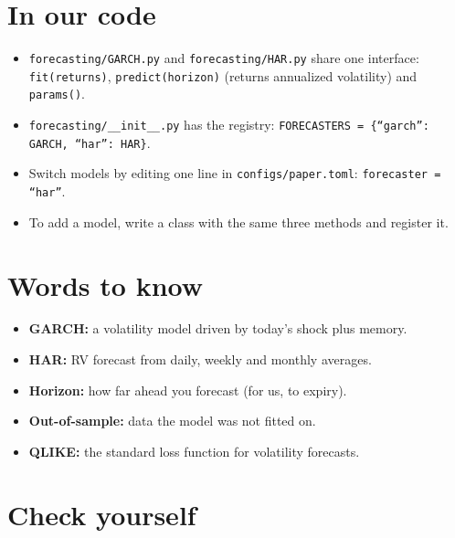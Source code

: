 \documentclass{article}
\begin{document}
\section{In our code}

\begin{itemize}

\item \texttt{forecasting/\allowbreak{}GARCH.\allowbreak{}py} and \texttt{forecasting/\allowbreak{}HAR.\allowbreak{}py} share one interface: \texttt{fit(returns)}, \texttt{predict(horizon)} (returns annualized volatility) and \texttt{params()}.

\item \texttt{forecasting/\allowbreak{}\_\allowbreak{}\_\allowbreak{}init\_\allowbreak{}\_\allowbreak{}.\allowbreak{}py} has the registry: \texttt{FORECASTERS = \{``garch'': GARCH,\allowbreak{} ``har'': HAR\}}.

\item Switch models by editing one line in \texttt{configs/\allowbreak{}paper.\allowbreak{}toml}: \texttt{forecaster = ``har''}.

\item To add a model, write a class with the same three methods and register it.

\end{itemize}

\section{Words to know}

\begin{itemize}

\item \textbf{GARCH:} a volatility model driven by today's shock plus memory.

\item \textbf{HAR:} RV forecast from daily, weekly and monthly averages.

\item \textbf{Horizon:} how far ahead you forecast (for us, to expiry).

\item \textbf{Out-of-sample:} data the model was not fitted on.

\item \textbf{QLIKE:} the standard loss function for volatility forecasts.

\end{itemize}

\section{Check yourself}
\end{document}
